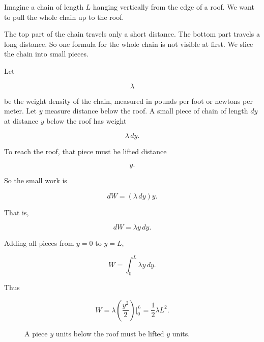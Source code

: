 Imagine a chain of length \(L\) hanging vertically from the edge of a roof.  We want to
pull the whole chain up to the roof.

The top part of the chain travels only a short distance.  The bottom part travels a long
distance.  So one formula for the whole chain is not visible at first.  We slice the chain
into small pieces.

Let

\[
\lambda
\]

be the weight density of the chain, measured in pounds per foot or newtons per meter.
Let \(y\) measure distance below the roof.  A small piece of chain of length \(dy\) at
distance \(y\) below the roof has weight

\[
\lambda\,dy.
\]

To reach the roof, that piece must be lifted distance

\[
y.
\]

So the small work is

\[
dW=(\lambda\,dy)y.
\]

That is,

\[
dW=\lambda y\,dy.
\]

Adding all pieces from \(y=0\) to \(y=L\),

\[
W=\int_0^L \lambda y\,dy.
\]

Thus

\[
W
=
\lambda\left(\frac{y^2}{2}\right)\Big|_0^L
=
\boxed{\frac12\lambda L^2}.
\]

\begin{figure}[h]
\centering
{}
\caption{A piece \(y\) units below the roof must be lifted \(y\) units.}
\label{fig:lifting-chain}
\end{figure}


